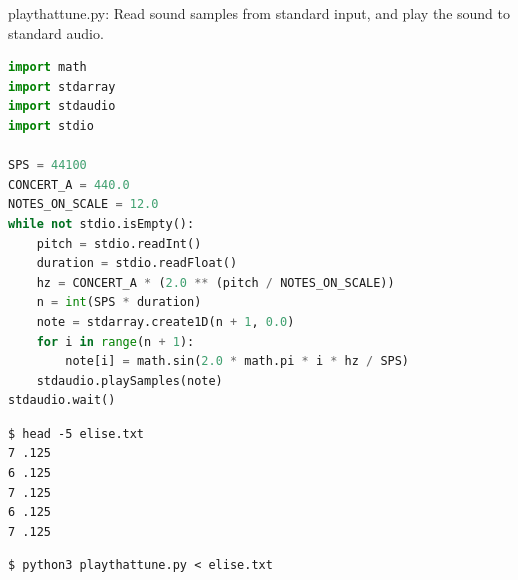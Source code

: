 \documentclass[8pt,a4paper,compress]{beamer}
\begin{document}
\begin{frame}[fragile]
\pause

\begin{framed}
\tiny playthattune.py: Read sound samples from standard input, and play the sound to standard audio.
\end{framed}

\begin{lstlisting}[language=Python,style=focusin]
import math
import stdarray
import stdaudio
import stdio

SPS = 44100
CONCERT_A = 440.0
NOTES_ON_SCALE = 12.0
while not stdio.isEmpty():
    pitch = stdio.readInt()
    duration = stdio.readFloat()
    hz = CONCERT_A * (2.0 ** (pitch / NOTES_ON_SCALE))
    n = int(SPS * duration)
    note = stdarray.create1D(n + 1, 0.0)
    for i in range(n + 1):
        note[i] = math.sin(2.0 * math.pi * i * hz / SPS)
    stdaudio.playSamples(note)
stdaudio.wait()
\end{lstlisting}

\pause\bigskip

\begin{minipage}{150pt}
\begin{lstlisting}[language={},style=focusin]
$ head -5 elise.txt
7 .125 
6 .125 
7 .125 
6 .125 
7 .125 
\end{lstlisting}

\pause

\begin{lstlisting}[language={},style=focusin]
$ python3 playthattune.py < elise.txt
\end{lstlisting}
\end{minipage}%
\begin{minipage}{150pt}
\hfill {}
\end{minipage}
\end{frame}
\end{document}
